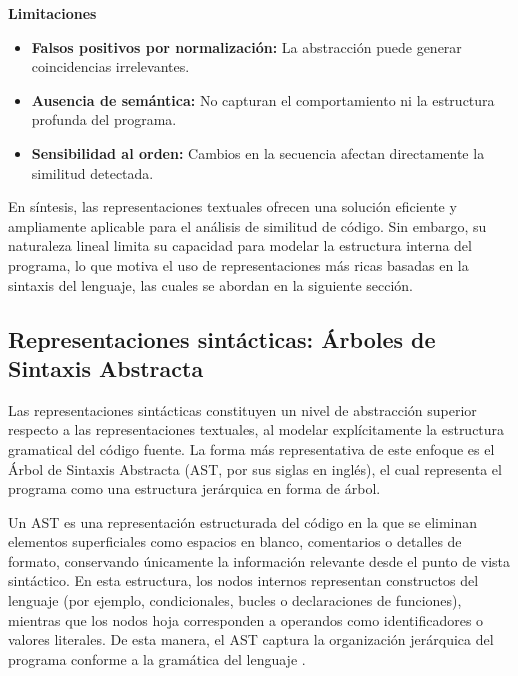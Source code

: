 \textbf{Limitaciones}
\begin{itemize}
    \item \textbf{Falsos positivos por normalización:} La abstracción puede generar coincidencias irrelevantes.
    
    \item \textbf{Ausencia de semántica:} No capturan el comportamiento ni la estructura profunda del programa.
    
    \item \textbf{Sensibilidad al orden:} Cambios en la secuencia afectan directamente la similitud detectada.
\end{itemize}

En síntesis, las representaciones textuales ofrecen una solución eficiente y ampliamente aplicable para el análisis de similitud de código. Sin embargo, su naturaleza lineal limita su capacidad para modelar la estructura interna del programa, lo que motiva el uso de representaciones más ricas basadas en la sintaxis del lenguaje, las cuales se abordan en la siguiente sección.



\subsection{Representaciones sintácticas: Árboles de Sintaxis Abstracta}

Las representaciones sintácticas constituyen un nivel de abstracción superior respecto a las representaciones textuales, al modelar explícitamente la estructura gramatical del código fuente. La forma más representativa de este enfoque es el Árbol de Sintaxis Abstracta (AST, por sus siglas en inglés), el cual representa el programa como una estructura jerárquica en forma de árbol.

Un AST es una representación estructurada del código en la que se eliminan elementos superficiales como espacios en blanco, comentarios o detalles de formato, conservando únicamente la información relevante desde el punto de vista sintáctico. En esta estructura, los nodos internos representan constructos del lenguaje (por ejemplo, condicionales, bucles o declaraciones de funciones), mientras que los nodos hoja corresponden a operandos como identificadores o valores literales. De esta manera, el AST captura la organización jerárquica del programa conforme a la gramática del lenguaje \cite{Roy2007Survey, Bogomolov2021Authorship}.

